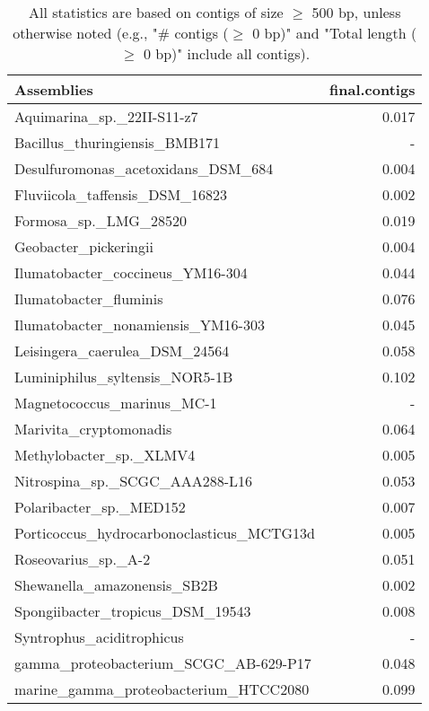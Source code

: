 \documentclass[12pt,a4paper]{article}
\begin{document}
\begin{table}[ht]
\begin{center}
\caption{All statistics are based on contigs of size $\geq$ 500 bp, unless otherwise noted (e.g., "\# contigs ($\geq$ 0 bp)" and "Total length ($\geq$ 0 bp)" include all contigs).}
\begin{tabular}{|l*{1}{|r}|}
\hline
Assemblies & final.contigs \\ \hline
Aquimarina\_sp.\_22II-S11-z7 & 0.017 \\ \hline
Bacillus\_thuringiensis\_BMB171 & - \\ \hline
Desulfuromonas\_acetoxidans\_DSM\_684 & 0.004 \\ \hline
Fluviicola\_taffensis\_DSM\_16823 & 0.002 \\ \hline
Formosa\_sp.\_LMG\_28520 & 0.019 \\ \hline
Geobacter\_pickeringii & 0.004 \\ \hline
Ilumatobacter\_coccineus\_YM16-304 & 0.044 \\ \hline
Ilumatobacter\_fluminis & 0.076 \\ \hline
Ilumatobacter\_nonamiensis\_YM16-303 & 0.045 \\ \hline
Leisingera\_caerulea\_DSM\_24564 & 0.058 \\ \hline
Luminiphilus\_syltensis\_NOR5-1B & 0.102 \\ \hline
Magnetococcus\_marinus\_MC-1 & - \\ \hline
Marivita\_cryptomonadis & 0.064 \\ \hline
Methylobacter\_sp.\_XLMV4 & 0.005 \\ \hline
Nitrospina\_sp.\_SCGC\_AAA288-L16 & 0.053 \\ \hline
Polaribacter\_sp.\_MED152 & 0.007 \\ \hline
Porticoccus\_hydrocarbonoclasticus\_MCTG13d & 0.005 \\ \hline
Roseovarius\_sp.\_A-2 & 0.051 \\ \hline
Shewanella\_amazonensis\_SB2B & 0.002 \\ \hline
Spongiibacter\_tropicus\_DSM\_19543 & 0.008 \\ \hline
Syntrophus\_aciditrophicus & - \\ \hline
gamma\_proteobacterium\_SCGC\_AB-629-P17 & 0.048 \\ \hline
marine\_gamma\_proteobacterium\_HTCC2080 & 0.099 \\ \hline
\end{tabular}
\end{center}
\end{table}
\end{document}

